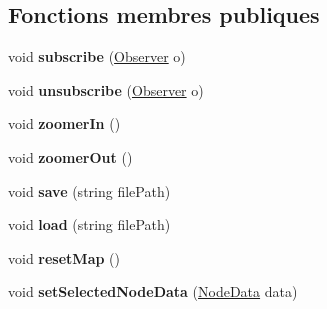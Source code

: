 \subsection*{Fonctions membres publiques}
\begin{DoxyCompactItemize}
\item 
\hypertarget{class_interface_graphique_1_1_engine_a8c04978eccf024796983289289203f82}{void {\bfseries subscribe} (\hyperlink{interface_interface_graphique_1_1_observer}{Observer} o)}\label{class_interface_graphique_1_1_engine_a8c04978eccf024796983289289203f82}

\item 
\hypertarget{class_interface_graphique_1_1_engine_a895121412380b33a67828f1068219a89}{void {\bfseries unsubscribe} (\hyperlink{interface_interface_graphique_1_1_observer}{Observer} o)}\label{class_interface_graphique_1_1_engine_a895121412380b33a67828f1068219a89}

\item 
\hypertarget{class_interface_graphique_1_1_engine_a6909b848f3b91e4bb7b8c0b5e333c2de}{void {\bfseries zoomer\-In} ()}\label{class_interface_graphique_1_1_engine_a6909b848f3b91e4bb7b8c0b5e333c2de}

\item 
\hypertarget{class_interface_graphique_1_1_engine_ab957792fa2360ef7c4f5f04e10c6d74a}{void {\bfseries zoomer\-Out} ()}\label{class_interface_graphique_1_1_engine_ab957792fa2360ef7c4f5f04e10c6d74a}

\item 
\hypertarget{class_interface_graphique_1_1_engine_a0fb07b6bff1c88bdfe1e2b5adcb34cf1}{void {\bfseries save} (string file\-Path)}\label{class_interface_graphique_1_1_engine_a0fb07b6bff1c88bdfe1e2b5adcb34cf1}

\item 
\hypertarget{class_interface_graphique_1_1_engine_a94b583a2122b3dc2f6e0567b80b4ca50}{void {\bfseries load} (string file\-Path)}\label{class_interface_graphique_1_1_engine_a94b583a2122b3dc2f6e0567b80b4ca50}

\item 
\hypertarget{class_interface_graphique_1_1_engine_a0a39b1977a086a14c6e234fedbf442d3}{void {\bfseries reset\-Map} ()}\label{class_interface_graphique_1_1_engine_a0a39b1977a086a14c6e234fedbf442d3}

\item 
\hypertarget{class_interface_graphique_1_1_engine_af89449879c6caf46a2f8c499558b5426}{void {\bfseries set\-Selected\-Node\-Data} (\hyperlink{struct_interface_graphique_1_1_node_data}{Node\-Data} data)}\label{class_interface_graphique_1_1_engine_af89449879c6caf46a2f8c499558b5426}


\end{DoxyCompactItemize}
